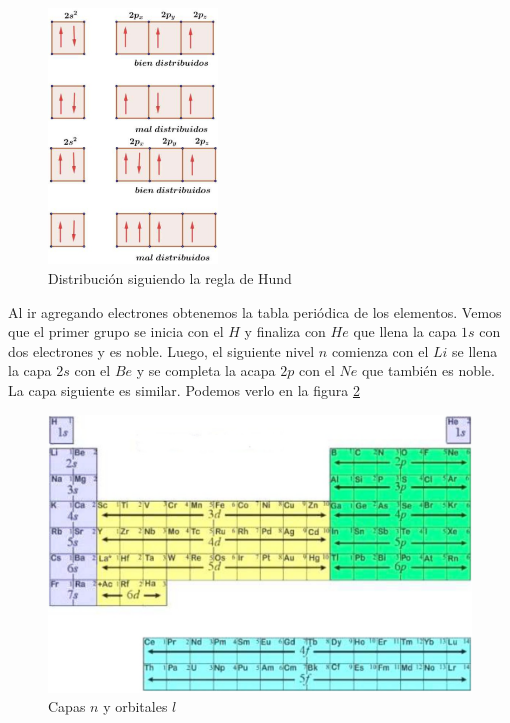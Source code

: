 \begin{figure}[H]
    \centering
    \includegraphics[width=0.4\textwidth]{./Figures/fig121}
	\caption{Distribución siguiendo la regla de Hund}
	\label{fig:121}
 \end{figure}

Al ir agregando electrones obtenemos la tabla periódica de los elementos. Vemos que el primer grupo se inicia con el $H$ y finaliza con $He$ que llena la capa $1s$ con dos electrones y es noble. Luego, el siguiente nivel $n$ comienza con el $Li$ se llena la capa $2s$ con el $Be$ y se completa la acapa $2p$ con el $Ne$ que también es noble. La capa siguiente es similar. Podemos verlo en la figura \ref{fig:122}


\begin{figure}[H]
    \centering
    \includegraphics[width=1.0\textwidth]{./Figures/fig122}
	\caption{Capas $n$ y orbitales $l$}
	\label{fig:122}
 \end{figure}

